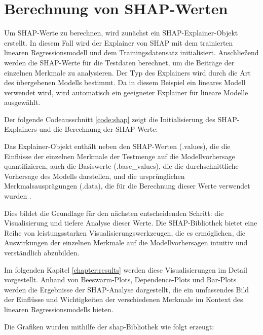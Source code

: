 





\section{Berechnung von SHAP-Werten}

Um SHAP-Werte zu berechnen, wird zunächst ein SHAP-Explainer-Objekt erstellt. In diesem Fall wird der Explainer 
von SHAP mit dem trainierten linearen Regressionsmodell und dem Trainingsdatensatz initialisiert. 
Anschließend werden die SHAP-Werte für die Testdaten berechnet, um die Beiträge der einzelnen Merkmale 
zu analysieren. Der Typ des Explainers wird durch die Art des übergebenen Modells bestimmt. 
Da in diesem Beispiel ein lineares Modell verwendet wird, wird automatisch ein geeigneter Explainer 
für lineare Modelle ausgewählt.

Der folgende Codeausschnitt \ref{code:shap} zeigt die Initialisierung des SHAP-Explainers und die Berechnung der SHAP-Werte:



Das Explainer-Objekt enthält neben den SHAP-Werten (.values), 
die die Einflüsse der einzelnen Merkmale der Testmenge auf die Modellvorhersage quantifizieren, 
auch die Basiswerte (.base\_values), die die durchschnittliche Vorhersage des Modells darstellen, 
und die ursprünglichen Merkmalsausprägungen (.data), die für die Berechnung dieser Werte verwendet wurden \cite[S. 51]{Molnar_2023}.

Dies bildet die Grundlage für den nächsten entscheidenden Schritt: 
die Visualisierung und tiefere Analyse dieser Werte. Die SHAP-Bibliothek bietet eine 
Reihe von leistungsstarken Visualisierungswerkzeugen, die es ermöglichen, die Auswirkungen 
der einzelnen Merkmale auf die Modellvorhersagen intuitiv und verständlich abzubilden. 

Im folgenden Kapitel \ref{chapter:results} werden diese Visualisierungen im Detail vorgestellt. 
Anhand von Beeswarm-Plots, Dependence-Plots und Bar-Plots werden die Ergebnisse der 
SHAP-Analyse dargestellt, die ein umfassendes Bild der Einflüsse und Wichtigkeiten der 
verschiedenen Merkmale im Kontext des linearen Regressionsmodells bieten.

Die Grafiken wurden mithilfe der \textsf{shap}-Bibliothek wie folgt erzeugt:



